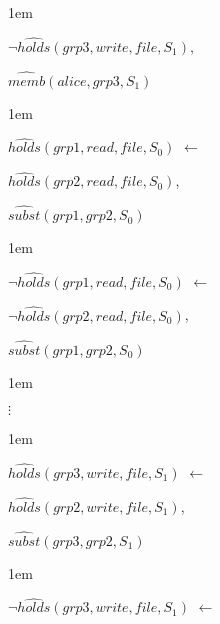 \documentclass[glov2,twocolumn,final]{svjour2}
\newenvironment{vquote}
  {\begin{list}{}{\leftmargin 1em}\item[]}
  {\end{list}}
\begin{document}
\begin{enumerate}
\begin{vquote}
           \hspace{1em}
           $\lnot \hat{holds}(grp3, write, file, S_{1})$,

           \hspace{1em}
           $\hat{memb}(alice, grp3, S_{1})$
         \end{vquote}

         \begin{vquote}
           $\hat{holds}(grp1, read, file, S_{0})$ $\leftarrow$

           \hspace{1em}
           $\hat{holds}(grp2, read, file, S_{0})$,

           \hspace{1em}
           $\hat{subst}(grp1, grp2, S_{0})$
         \end{vquote}

         \begin{vquote}
           $\lnot \hat{holds}(grp1, read, file, S_{0})$ $\leftarrow$

           \hspace{1em}
           $\lnot \hat{holds}(grp2, read, file, S_{0})$,

           \hspace{1em}
           $\hat{subst}(grp1, grp2, S_{0})$
         \end{vquote}

         \begin{vquote}
           \hspace{2em}$\vdots$
         \end{vquote}

         \begin{vquote}
           $\hat{holds}(grp3, write, file, S_{1})$ $\leftarrow$

           \hspace{1em}
           $\hat{holds}(grp2, write, file, S_{1})$,

           \hspace{1em}
           $\hat{subst}(grp3, grp2, S_{1})$
         \end{vquote}

         \begin{vquote}
           $\lnot \hat{holds}(grp3, write, file, S_{1})$ $\leftarrow$


\end{vquote}
\end{enumerate}
\end{document}
